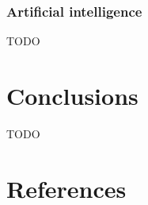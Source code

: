 \documentclass[numbers,sort&compress]{IntechOpen-Book}%
\begin{document}
\subsubsection*{Artificial intelligence}

TODO

\begin{backmatter}

\section{Conclusions}

TODO

\begin{authordetails}

	\author{Georg Hackenberg$^{1*\dagger}$ and Christian Zehetner$^{1\dagger}$}
	\address[1]{School of Engineering, University of Applied Sciences Upper Austria, Wels, Austria}
	\address{*Address all correspondence to: georg.hackenberg@fh-wels.at}
	\address{\dag\ These authors contributed equally}
	
	
\end{authordetails}

\section*{References}




\end{backmatter}
\end{document}
